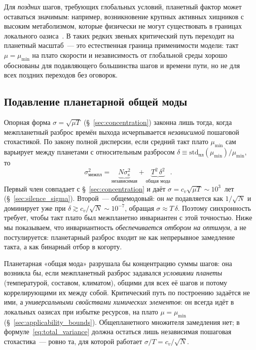\documentclass[12pt,a4paper]{article}
\begin{document}
Для \emph{поздних} шагов, требующих глобальных условий, планетный фактор может оставаться значимым: например, возникновение крупных активных хищников с высоким метаболизмом, которые физически не могут существовать в границах локального оазиса~\cite{Knoll2014}. В таких редких звеньях критический путь переходит на планетный масштаб~--- это естественная граница применимости модели: такт $\mu = \mu_{\min}$ на плато скорости и независимость от глобальной среды хорошо обоснованы для подавляющего большинства шагов и времени пути, но не для всех поздних переходов без оговорок.

\subsection{Подавление планетарной общей моды}
\label{sec:planetary_spread}

Опорная форма $\sigma = \sqrt{\mu T}$ (\S~\ref{sec:concentration}) законна лишь
тогда, когда межпланетный разброс времён выхода исчерпывается \emph{независимой}
пошаговой стохастикой. По закону полной дисперсии, если средний такт плато
$\mu_{\min}$ сам варьирует между планетами с относительным разбросом
$\delta \equiv \mathrm{std}_{\mathrm{пл}}(\mu_{\min})/\mu_{\min}$, то
\begin{equation}
\sigma^2_{\mathrm{межпл}}
  = \underbrace{N\sigma_{\mathrm{s}}^2}_{\text{независимая}}
  + \underbrace{T^2\,\delta^2}_{\text{общая мода}}.
\label{eq:total_variance}
\end{equation}
Первый член совпадает с \S~\ref{sec:concentration} и даёт $\sigma = c_v\sqrt{\mu T}\sim10^3$~лет (\S~\ref{sec:silence_sigma}).
Второй~--- общемодовый: он \emph{не} подавляется как $1/\sqrt{N}$ и доминирует уже
при $\delta \gtrsim c_v/\sqrt{N}\sim10^{-7}$, обращая $\sigma \approx T\,\delta$.
Поэтому синхронность требует, чтобы такт плато был межпланетно инвариантен с этой
точностью. Ниже мы показываем, что инвариантность \emph{обеспечивается отбором на
оптимум}, а не постулируется: планетарный разброс входит не как непрерывное
замедление такта, а как бинарный отбор в когорту.

Планетарная «общая мода» разрушала бы концентрацию суммы шагов: она возникла бы,
если межпланетный разброс задавался \emph{условиями планеты} (температурой,
составом, климатом), общими для всех её шагов и потому коррелирующими их между
собой. Критический путь по построению задаётся не ими, а \emph{универсальными
свойствами химических элементов}: он всегда идёт в локальных оазисах при избытке
ресурсов, на плато $\mu = \mu_{\min}$ (\S~\ref{sec:applicability_bounds}). Общепланетного множителя замедления нет; в
формуле~\eqref{eq:total_variance} должна остаться лишь независимая пошаговая
стохастика~--- ровно та, для которой работает $\sigma/T = c_v/\sqrt{N}$.
\end{document}
